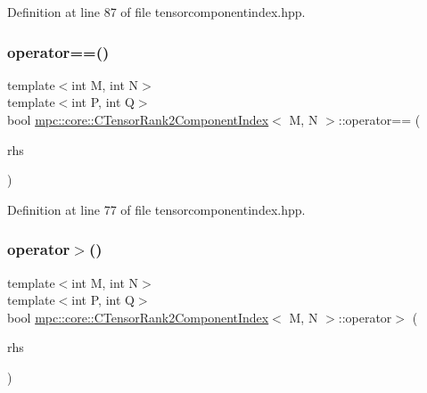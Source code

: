 Definition at line 87 of file tensorcomponentindex.\+hpp.

\mbox{\label{classmpc_1_1core_1_1_c_tensor_rank2_component_index_a3b672ed7feddcd26a97b5bdf8c951724}} 
\subsubsection{\texorpdfstring{operator==()}{operator==()}}
{\footnotesize\ttfamily template$<$int M, int N$>$ \\
template$<$int P, int Q$>$ \\
bool \mbox{\hyperlink{classmpc_1_1core_1_1_c_tensor_rank2_component_index}{mpc\+::core\+::\+C\+Tensor\+Rank2\+Component\+Index}}$<$ M, N $>$\+::operator== (\begin{DoxyParamCaption}\item[{const \mbox{\hyperlink{classmpc_1_1core_1_1_c_tensor_rank2_component_index}{C\+Tensor\+Rank2\+Component\+Index}}$<$ P, Q $>$ \&}]{rhs }\end{DoxyParamCaption})\hspace{0.3cm}{\ttfamily [inline]}}



Definition at line 77 of file tensorcomponentindex.\+hpp.

\mbox{\label{classmpc_1_1core_1_1_c_tensor_rank2_component_index_a09ad8de90ca42234aa1b37ece4f6f989}} 
\subsubsection{\texorpdfstring{operator$>$()}{operator>()}}
{\footnotesize\ttfamily template$<$int M, int N$>$ \\
template$<$int P, int Q$>$ \\
bool \mbox{\hyperlink{classmpc_1_1core_1_1_c_tensor_rank2_component_index}{mpc\+::core\+::\+C\+Tensor\+Rank2\+Component\+Index}}$<$ M, N $>$\+::operator$>$ (\begin{DoxyParamCaption}\item[{const \mbox{\hyperlink{classmpc_1_1core_1_1_c_tensor_rank2_component_index}{C\+Tensor\+Rank2\+Component\+Index}}$<$ P, Q $>$ \&}]{rhs }\end{DoxyParamCaption})\hspace{0.3cm}{\ttfamily [inline]}}



